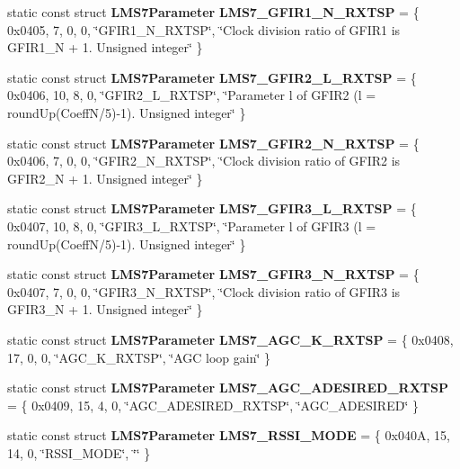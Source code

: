 \begin{DoxyCompactItemize}
\item 
static const struct {\bf L\+M\+S7\+Parameter} {\bf L\+M\+S7\+\_\+\+G\+F\+I\+R1\+\_\+\+N\+\_\+\+R\+X\+T\+SP} = \{ 0x0405, 7, 0, 0, \char`\"{}\+G\+F\+I\+R1\+\_\+\+N\+\_\+\+R\+X\+T\+S\+P\char`\"{}, \char`\"{}\+Clock division ratio of G\+F\+I\+R1 is G\+F\+I\+R1\+\_\+\+N + 1. Unsigned integer\char`\"{} \}
\item 
static const struct {\bf L\+M\+S7\+Parameter} {\bf L\+M\+S7\+\_\+\+G\+F\+I\+R2\+\_\+\+L\+\_\+\+R\+X\+T\+SP} = \{ 0x0406, 10, 8, 0, \char`\"{}\+G\+F\+I\+R2\+\_\+\+L\+\_\+\+R\+X\+T\+S\+P\char`\"{}, \char`\"{}\+Parameter l of G\+F\+I\+R2 (l = round\+Up(\+Coeff\+N/5)-\/1). Unsigned integer\char`\"{} \}
\item 
static const struct {\bf L\+M\+S7\+Parameter} {\bf L\+M\+S7\+\_\+\+G\+F\+I\+R2\+\_\+\+N\+\_\+\+R\+X\+T\+SP} = \{ 0x0406, 7, 0, 0, \char`\"{}\+G\+F\+I\+R2\+\_\+\+N\+\_\+\+R\+X\+T\+S\+P\char`\"{}, \char`\"{}\+Clock division ratio of G\+F\+I\+R2 is G\+F\+I\+R2\+\_\+\+N + 1. Unsigned integer\char`\"{} \}
\item 
static const struct {\bf L\+M\+S7\+Parameter} {\bf L\+M\+S7\+\_\+\+G\+F\+I\+R3\+\_\+\+L\+\_\+\+R\+X\+T\+SP} = \{ 0x0407, 10, 8, 0, \char`\"{}\+G\+F\+I\+R3\+\_\+\+L\+\_\+\+R\+X\+T\+S\+P\char`\"{}, \char`\"{}\+Parameter l of G\+F\+I\+R3 (l = round\+Up(\+Coeff\+N/5)-\/1). Unsigned integer\char`\"{} \}
\item 
static const struct {\bf L\+M\+S7\+Parameter} {\bf L\+M\+S7\+\_\+\+G\+F\+I\+R3\+\_\+\+N\+\_\+\+R\+X\+T\+SP} = \{ 0x0407, 7, 0, 0, \char`\"{}\+G\+F\+I\+R3\+\_\+\+N\+\_\+\+R\+X\+T\+S\+P\char`\"{}, \char`\"{}\+Clock division ratio of G\+F\+I\+R3 is G\+F\+I\+R3\+\_\+\+N + 1. Unsigned integer\char`\"{} \}
\item 
static const struct {\bf L\+M\+S7\+Parameter} {\bf L\+M\+S7\+\_\+\+A\+G\+C\+\_\+\+K\+\_\+\+R\+X\+T\+SP} = \{ 0x0408, 17, 0, 0, \char`\"{}\+A\+G\+C\+\_\+\+K\+\_\+\+R\+X\+T\+S\+P\char`\"{}, \char`\"{}\+A\+G\+C loop gain\char`\"{} \}
\item 
static const struct {\bf L\+M\+S7\+Parameter} {\bf L\+M\+S7\+\_\+\+A\+G\+C\+\_\+\+A\+D\+E\+S\+I\+R\+E\+D\+\_\+\+R\+X\+T\+SP} = \{ 0x0409, 15, 4, 0, \char`\"{}\+A\+G\+C\+\_\+\+A\+D\+E\+S\+I\+R\+E\+D\+\_\+\+R\+X\+T\+S\+P\char`\"{}, \char`\"{}\+A\+G\+C\+\_\+\+A\+D\+E\+S\+I\+R\+E\+D\char`\"{} \}
\item 
static const struct {\bf L\+M\+S7\+Parameter} {\bf L\+M\+S7\+\_\+\+R\+S\+S\+I\+\_\+\+M\+O\+DE} = \{ 0x040\+A, 15, 14, 0, \char`\"{}\+R\+S\+S\+I\+\_\+\+M\+O\+D\+E\char`\"{}, \char`\"{}\char`\"{} \}

\end{DoxyCompactItemize}
